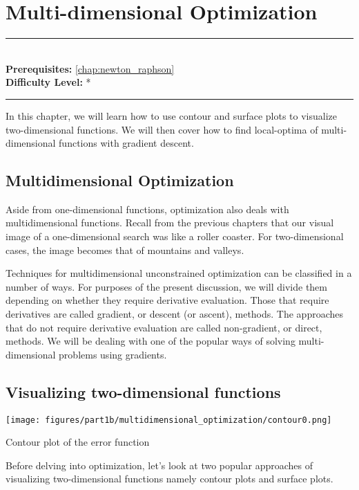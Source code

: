 \documentclass[book.tex]{subfiles}
\begin{document}
\chapter{Multi-dimensional Optimization}
\label{chap:multidimensional}
\noindent\rule{11cm}{0.4pt} \\
\textbf{Prerequisites:} \autoref{chap:newton_raphson} \\
\textbf{Difficulty Level:} * \\
\noindent\rule{11cm}{0.4pt}
\vspace{5mm}

In this chapter, we will learn how to use contour and surface plots to visualize two-dimensional functions. We will then cover how to find local-optima of multi-dimensional functions with gradient descent. 

\section{Multidimensional Optimization}
Aside from one-dimensional functions, optimization also deals with multidimensional functions. Recall from the previous chapters that our visual image of a one-dimensional search was like a roller coaster. For two-dimensional cases, the image becomes that of mountains and valleys.

Techniques for multidimensional unconstrained optimization can be classified in a
number of ways. For purposes of the present discussion, we will divide them depending
on whether they require derivative evaluation. Those that require derivatives are called
gradient, or descent (or ascent), methods. The approaches that do not require derivative evaluation are called non-gradient, or direct, methods. We will be dealing with one of the popular ways of solving multi-dimensional problems using gradients.
\section{Visualizing two-dimensional functions}
\begin{marginfigure}
	\centering
 \texttt{[image: figures/part1b/multidimensional\_optimization/contour0.png]}
	\centering
	\caption{Contour plot of the error function}
	\label{fig:1}
\end{marginfigure}

Before delving into optimization, let's look at two popular approaches of visualizing two-dimensional functions namely contour plots and surface plots.
\end{document}

